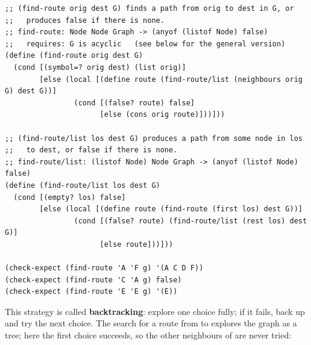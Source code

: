 \begin{lstlisting}[style=racket]
;; (find-route orig dest G) finds a path from orig to dest in G, or
;;   produces false if there is none.
;; find-route: Node Node Graph -> (anyof (listof Node) false)
;;   requires: G is acyclic   (see below for the general version)
(define (find-route orig dest G)
  (cond [(symbol=? orig dest) (list orig)]
        [else (local [(define route (find-route/list (neighbours orig G) dest G))]
                (cond [(false? route) false]
                      [else (cons orig route)]))]))

;; (find-route/list los dest G) produces a path from some node in los
;;   to dest, or false if there is none.
;; find-route/list: (listof Node) Node Graph -> (anyof (listof Node) false)
(define (find-route/list los dest G)
  (cond [(empty? los) false]
        [else (local [(define route (find-route (first los) dest G))]
                (cond [(false? route) (find-route/list (rest los) dest G)]
                      [else route]))]))

(check-expect (find-route 'A 'F g) '(A C D F))
(check-expect (find-route 'C 'A g) false)
(check-expect (find-route 'E 'E g) '(E))
\end{lstlisting}

This strategy is called \textbf{backtracking}: explore one choice fully; if
it fails, back up and try the next choice. The search for a route from  to
 explores the graph as a tree; here the first choice succeeds, so the
other neighbours of  are never tried:

\begin{center}
\end{center}

